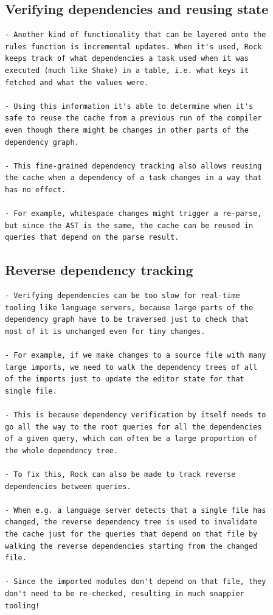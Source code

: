 \documentclass[12pt, a4paper]{report}
\begin{document}
\subsection*{Verifying dependencies and reusing state \cite{olle_query_based}}

\begin{verbatim}
- Another kind of functionality that can be layered onto the
rules function is incremental updates. When it's used, Rock
keeps track of what dependencies a task used when it was
executed (much like Shake) in a table, i.e. what keys it
fetched and what the values were.

- Using this information it's able to determine when it's
safe to reuse the cache from a previous run of the compiler
even though there might be changes in other parts of the
dependency graph.

- This fine-grained dependency tracking also allows reusing
the cache when a dependency of a task changes in a way that
has no effect.

- For example, whitespace changes might trigger a re-parse,
but since the AST is the same, the cache can be reused in
queries that depend on the parse result.
\end{verbatim}
\cite{olle_query_based}

\subsection*{Reverse dependency tracking \cite{olle_query_based}}

\begin{verbatim}
- Verifying dependencies can be too slow for real-time
tooling like language servers, because large parts of the
dependency graph have to be traversed just to check that
most of it is unchanged even for tiny changes.

- For example, if we make changes to a source file with many
large imports, we need to walk the dependency trees of all
of the imports just to update the editor state for that
single file.

- This is because dependency verification by itself needs to
go all the way to the root queries for all the dependencies
of a given query, which can often be a large proportion of
the whole dependency tree.

- To fix this, Rock can also be made to track reverse
dependencies between queries.

- When e.g. a language server detects that a single file has
changed, the reverse dependency tree is used to invalidate
the cache just for the queries that depend on that file by
walking the reverse dependencies starting from the changed
file.

- Since the imported modules don't depend on that file, they
don't need to be re-checked, resulting in much snappier
tooling!
\end{verbatim}
\cite{olle_query_based}
\end{document}
